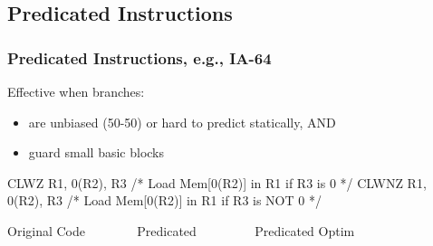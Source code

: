 \documentclass{beamer}
\renewcommand{\emph}[1]{\textcolor{structure}{#1}}
\newcommand{\emp}[1]{\textcolor{DikuRed}{ #1}}
\begin{document}
\subsection{Predicated Instructions}

\begin{frame}[fragile,t]
    \frametitle{Predicated Instructions, e.g., IA-64}

Effective when branches:
\begin{itemize}
    \item are unbiased (50-50) or hard to predict statically, AND
    \item guard small basic blocks
\end  {itemize}

\begin{colorcode}[fontsize=\scriptsize]
    CLWZ  R1, 0(R2), R3   /* Load Mem[0(R2)] in R1 if R3 is     0 */
    CLWNZ R1, 0(R2), R3   /* Load Mem[0(R2)] in R1 if R3 is NOT 0 */
\end{colorcode}


\begin{block}{Original Code{\tt~~~~~~~~}Predicated{\tt~~~~~~~~~}Predicated Optim}\vspace{-1ex}
\begin{columns}
\end{columns}
\end{block}

\bigskip


\end{frame}
\end{document}
